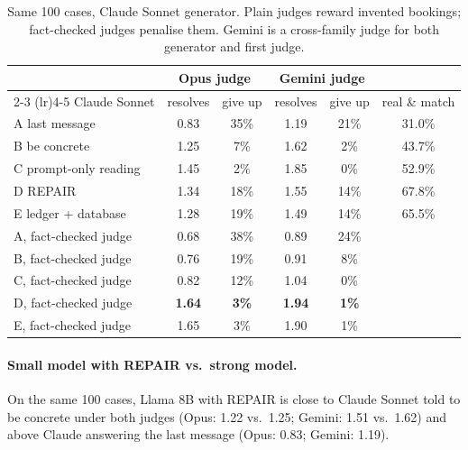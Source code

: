 \documentclass[11pt]{article}
\begin{document}
\begin{table}[h]
\centering
\begin{tabular}{lccccc}
\toprule
 & \multicolumn{2}{c}{Opus judge} & \multicolumn{2}{c}{Gemini judge} & \\
\cmidrule(lr){2-3} \cmidrule(lr){4-5}
Claude Sonnet & resolves & give up & resolves & give up & real \& match \\
\midrule
A last message & 0.83 & 35\% & 1.19 & 21\% & 31.0\% \\
B be concrete & 1.25 & 7\% & 1.62 & 2\% & 43.7\% \\
C prompt-only reading & 1.45 & 2\% & 1.85 & 0\% & 52.9\% \\
D REPAIR & 1.34 & 18\% & 1.55 & 14\% & 67.8\% \\
E ledger + database & 1.28 & 19\% & 1.49 & 14\% & 65.5\% \\
\midrule
A, fact-checked judge & 0.68 & 38\% & 0.89 & 24\% & \\
B, fact-checked judge & 0.76 & 19\% & 0.91 & 8\% & \\
C, fact-checked judge & 0.82 & 12\% & 1.04 & 0\% & \\
D, fact-checked judge & \textbf{1.64} & \textbf{3\%} & \textbf{1.94} & \textbf{1\%} & \\
E, fact-checked judge & 1.65 & 3\% & 1.90 & 1\% & \\
\bottomrule
\end{tabular}
\caption{Same 100 cases, Claude Sonnet generator. Plain judges reward invented bookings; fact-checked judges
penalise them. Gemini is a cross-family judge for both generator and first judge.}
\label{tab:claude}
\end{table}

\paragraph{Small model with REPAIR vs.\ strong model.} On the same 100 cases, Llama 8B with REPAIR is close
to Claude Sonnet told to be concrete under both judges (Opus: 1.22 vs.\ 1.25; Gemini: 1.51 vs.\ 1.62) and
above Claude answering the last message (Opus: 0.83; Gemini: 1.19).
\end{document}
